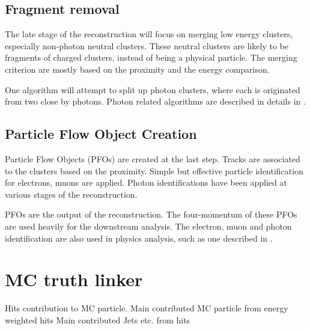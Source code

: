 \subsection{Fragment removal}
\label{sec:pandoraFragmentRemoval}
The late stage of the reconstruction will focus on merging low energy clusters, especially non-photon neutral clusters. These neutral clusters are likely to be fragments of charged clusters, instead of being a physical particle. The merging criterion are mostly based on the proximity and the energy comparison.

One algorithm will attempt to split up photon clusters, where each is originated from two close by photons. Photon related algorithms are described in details in .



\subsection{Particle Flow Object Creation}
\label{sec:pandoraPFOcreation}

Particle Flow Objects (PFOs) are created at the last step. Tracks are associated to the clusters based on the proximity. Simple but effective particle identification for electrons, muons are applied. Photon identifications have been applied at various stages of the reconstruction.

PFOs are the output of the \pandora reconstruction. The four-momentum of these PFOs are  used heavily for the downstream analysis. The electron, muon and photon identification are  also used in physics analysis, such as one described in .

\section{MC truth linker}
Hits contribution to MC particle.
Main contributed MC particle from energy weighted hits
Main contributed Jets etc. from hits

